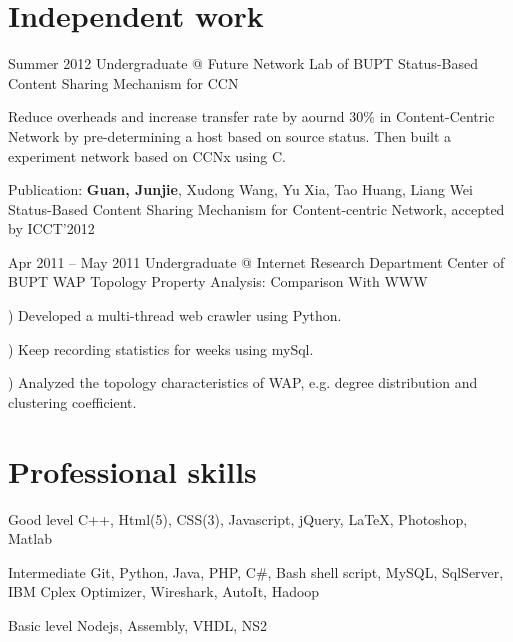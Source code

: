 \documentclass{tccv}
\begin{document}
\section{Independent work}


\begin{eventlist}

\item{Summer 2012}
     {Undergraduate @ Future Network Lab of BUPT}
     {Status-Based Content Sharing Mechanism for CCN}
     
	Reduce overheads and increase transfer rate by aournd 30\% in Content-Centric Network by pre-determining a host based on source status. Then built a experiment network based on CCNx using C. 

Publication: \textbf{Guan, Junjie}, Xudong Wang, Yu Xia, Tao Huang, Liang Wei Status-Based Content Sharing Mechanism for Content-centric Network, accepted by ICCT’2012

\item{Apr 2011 -- May 2011}
     {Undergraduate @ Internet Research Department Center of BUPT}
     {WAP Topology Property Analysis: Comparison With WWW}     
     
) Developed a multi-thread web crawler using Python. 

) Keep recording statistics for weeks using mySql. 

) Analyzed the topology characteristics of WAP, e.g. degree distribution and clustering coefficient.\newline

\end{eventlist}






















\if
\section{Professional skills}

\begin{factlist}

\item{Good level}
     {C++, Html(5), CSS(3), Javascript, jQuery, \LaTeX, Photoshop, Matlab}

\item{Intermediate}
     {Git, Python, Java, PHP, C\#, Bash shell script, MySQL, SqlServer, IBM Cplex Optimizer, Wireshark, AutoIt, Hadoop}

\item{Basic level}
     {Nodejs, Assembly, VHDL, NS2}

\end{factlist}

\fi
\end{document}
